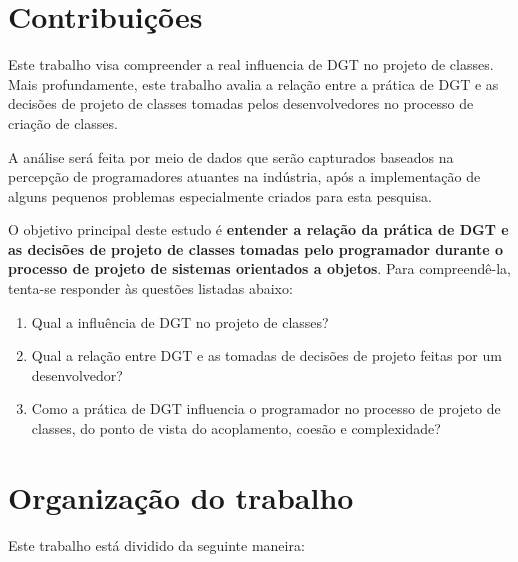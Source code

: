 \section{Contribuições}

Este trabalho
visa compreender a real influencia de DGT no projeto de classes.
Mais profundamente, este trabalho avalia a relação entre a prática de 
DGT
e as decisões de projeto de classes tomadas pelos desenvolvedores no processo de 
criação de classes.

A análise será feita por meio de dados que serão
capturados baseados na percepção de programadores atuantes na indústria, após
a implementação de alguns pequenos problemas especialmente criados para
esta pesquisa.

O objetivo principal deste estudo é \textbf{entender a relação da prática de DGT 
e as decisões de projeto de classes tomadas pelo programador durante o processo de 
projeto de sistemas orientados a objetos}.
Para compreendê-la, tenta-se responder às questões listadas
abaixo:

\begin{enumerate}

	\item Qual a influência de DGT no projeto de classes?

	\item Qual a relação entre DGT e as tomadas de decisões de projeto
	feitas por um desenvolvedor?

	\item Como a prática de DGT influencia o programador no processo de  
	projeto de classes, do ponto de vista do acoplamento, coesão e complexidade?

\end{enumerate}

\section{Organização do trabalho}

Este trabalho está dividido da seguinte maneira: 

